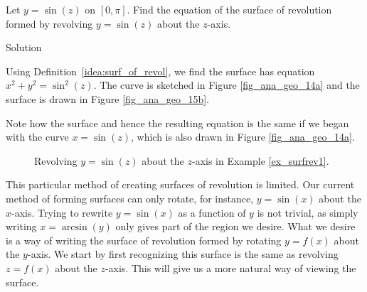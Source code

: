\begin{example}\label{ex_surfrev1}
Let $y=\sin(z)$ on $[0,\pi]$. Find the equation of the surface of revolution formed by revolving $y=\sin(z)$ about the $z$-axis.

Solution 

Using Definition~\ref{idea:surf_of_revol}, we find the surface has equation $x^2+y^2=\sin^2(z)$. The curve is sketched in Figure \ref{fig_ana_geo_14a} and the surface is drawn in Figure \ref{fig_ana_geo_15b}.

Note how the surface and hence the resulting equation is the same if we began with the curve $x=\sin(z)$, which is also drawn in Figure \ref{fig_ana_geo_14a}.


\begin{figure}[H]
\centering
\centerline{
\hspace{0.1cm}
}
\caption{Revolving $y=\sin(z)$ about the $z$-axis in Example \ref{ex_surfrev1}.}
\end{figure}


\end{example}


This particular method of creating surfaces of revolution is limited. Our current method of forming surfaces can only rotate, for instance, $y=\sin(x)$ about the $x$-axis. Trying to rewrite $y=\sin(x)$ as a function of $y$ is not trivial, as simply writing $x=\arcsin(y)$ only gives part of the region we desire. What we desire is a way of writing the surface of revolution formed by rotating $y=f(x)$ about the $y$-axis. We start by first recognizing this surface is the same as revolving $z=f(x)$ about the $z$-axis. This will give us a more natural way of viewing the surface. 

